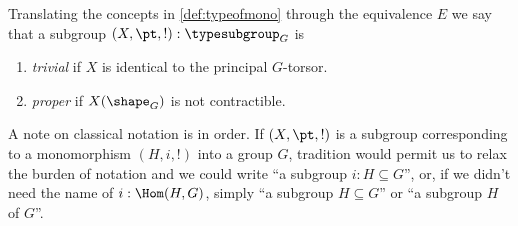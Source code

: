   Translating the concepts in \cref{def:typeofmono} through the equivalence $E$ we say that a subgroup $(X,\pt,!):\typesubgroup_G$ is
      \begin{enumerate}
      \item \emph{trivial} if $X$ is identical to the principal $G$-torsor.
      \item \emph{proper} if $X(\shape_G)$ is not contractible.
      \end{enumerate}

      \begin{remark}
      \label{rem:notationsubgroup}
      A note on classical notation is in order.
If $(X,\pt,!)$ is a subgroup corresponding to a monomorphism $(H,i,!)$ into a group $G$, tradition would permit us to relax the burden of notation and we could write ``a subgroup $i:H\subseteq G$'', or, if we didn't need the name of $i:\Hom(H,G)$, simply ``a subgroup $H\subseteq G$'' or ``a subgroup $H$ of $G$''.
    \end{remark}




